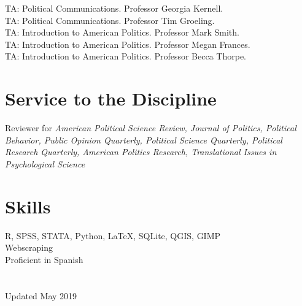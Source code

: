 \documentclass[11pt, a4paper]{article}
\newcommand{\years}[1]{\marginnote{\scriptsize #1}}
\begin{document}
\years{2018} TA: Political Communications. Professor Georgia Kernell.\\
\years{} TA: Political Communications. Professor Tim Groeling.\\
\years{2015} TA: Introduction to American Politics. Professor Mark Smith.\\
\years{} TA: Introduction to American Politics. Professor Megan Frances.\\
\years{2014} TA: Introduction to American Politics. Professor Becca Thorpe.

\section*{Service to the Discipline}

Reviewer for \textit{American Political Science Review, Journal of Politics, Political Behavior, Public Opinion Quarterly, Political Science Quarterly, Political Research Quarterly, American Politics Research, Translational Issues in Psychological Science}

\section*{Skills}

R, SPSS, STATA, Python, \LaTeX, SQLite, QGIS, GIMP\\
Webscraping\\
Proficient in Spanish\\
\\
\\
Updated May 2019
\end{document}
